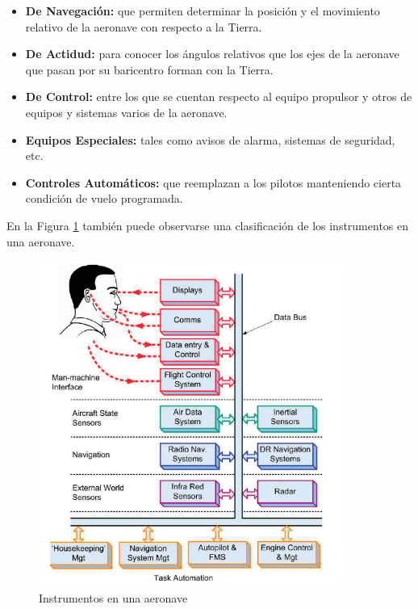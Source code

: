 \begin{itemize}
\item {\bf De Navegaci\'on:} que permiten determinar la posici\'on y el movimiento relativo de la aeronave con respecto a la Tierra.
\item {\bf De Actidud:} para conocer los \'angulos relativos que los ejes de la aeronave que pasan por su baricentro forman con la Tierra.
\item {\bf De Control:} entre los que se cuentan respecto al equipo propulsor y otros de equipos y sistemas varios de la aeronave.
\item {\bf Equipos Especiales:} tales como avisos de alarma, sistemas de seguridad, etc. 
\item {\bf Controles Autom\'aticos:} que reemplazan a los pilotos manteniendo cierta condici\'on de vuelo programada.
\end{itemize}

En la Figura \ref{fig:01.instrumentos.en.una.aeronave} tambi\'en puede observarse una clasificaci\'on de los instrumentos en una aeronave.

\begin{figure}[!htb]
  \centering
  \includegraphics[width=0.9\textwidth]{01.tablero.instrumentos/U01.imagenes/1.2.clasificacion.instrumentos/tipos_instrumentos.png}  
  \caption{Instrumentos en una aeronave \protect\cite{Introduction_to_Avionics_Systems}}
  \label{fig:01.instrumentos.en.una.aeronave}
\end{figure}

